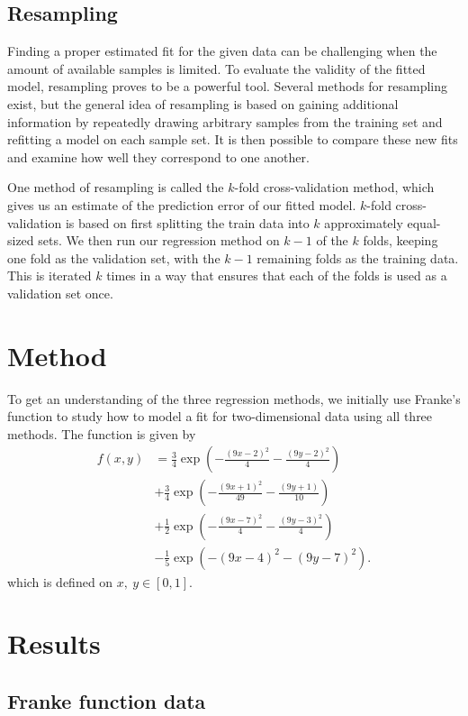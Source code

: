 \documentclass[a4paper, 10pt]{article}
\begin{document}
\begin{multicols}{2}
\subsection{Resampling}
Finding a proper estimated fit for the given data can be challenging when the amount of available samples is limited. To evaluate the validity of the fitted model, resampling proves to be a powerful tool. Several methods for resampling exist, but the general idea of resampling is based on gaining additional information by repeatedly drawing arbitrary samples from the training set and refitting a model on each sample set. It is then possible to compare these new fits and examine how well they correspond to one another.

One method of resampling is called the $k$-fold cross-validation method, which gives us an estimate of the prediction error of our fitted model. $k$-fold cross-validation is based on first splitting the train data into $k$ approximately equal-sized sets.  We then run our regression method on $k-1$ of the $k$ folds, keeping one fold as the validation set, with the $k-1$ remaining folds as the training data. This is iterated $k$ times in a way that ensures that each of the folds is used as a validation set once.



\section{Method}
To get an understanding of the three regression methods, we initially use Franke's function to study how to model a fit for two-dimensional data using all three methods. The function is given by
\begin{align}
f(x,y) &= \frac{3}{4}\exp{\left(-\frac{(9x-2)^2}{4}   - \frac{(9y-2)^2}{4}\right)} \nonumber\\
 &+\frac{3}{4}\exp{\left(-\frac{(9x+1)^2}{49}- \frac{(9y+1)}{10}\right)} \nonumber\\
 &+\frac{1}{2}\exp{\left(-\frac{(9x-7)^2}{4} - \frac{(9y-3)^2}{4}\right)} \nonumber\\
 &-\frac{1}{5}\exp{\left(-(9x-4)^2 - (9y-7)^2\right) }. \label{eq:Franke}
\end{align} which is defined on $x,\ y \in [0,1]$.









\section{Results}
\subsection{Franke function data}

\end{multicols}
\end{document}
